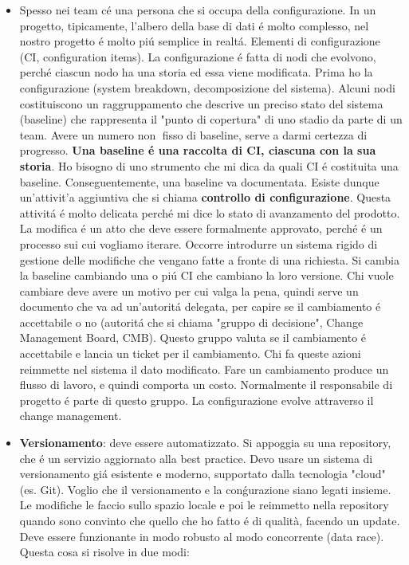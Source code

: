 \documentclass[a4paper,10pt] {article}
\begin{document}
\begin{itemize}
	\item Spesso nei team c\'e una persona che si occupa della configurazione. 
	In un progetto, tipicamente, l'albero della base
	di dati \'e molto complesso, nel nostro progetto \'e molto pi\'u semplice 
	in realt\'a.
	Elementi di configurazione (CI, configuration items). 
	La configurazione \'e fatta di nodi che evolvono, perch\'e ciascun 
	nodo ha una storia ed essa viene modificata. Prima ho la configurazione 
	(system breakdown, decomposizione del 
	sistema). 
	Alcuni nodi costituiscono un raggruppamento che 
	descrive un preciso stato del sistema (baseline) che rappresenta il "punto 
	di copertura" di uno stadio da 
	parte di un team. Avere un numero non fisso di baseline, serve a darmi 
	certezza di progresso. 
	\textbf{Una baseline \'e una raccolta di CI, ciascuna con la sua storia}. 
	Ho 
	bisogno di uno strumento che mi dica da quali CI \'e costituita una 
	baseline. 
	Conseguentemente, una baseline va documentata. Esiste
	dunque un'attivit'a aggiuntiva che si chiama \textbf{controllo di 
	configurazione}. 
	Questa attivit\'a \'e molto delicata
	perch\'e mi dice lo stato di avanzamento del prodotto. La modifica \'e un 
	atto 
	che deve essere formalmente
	approvato, perch\'e \'e un processo sui cui vogliamo iterare. Occorre 
	introdurre un sistema rigido di gestione
	delle modifiche che vengano fatte a fronte di una richiesta. Si cambia la 
	baseline cambiando una o pi\'u CI
	che cambiano la loro versione. Chi vuole cambiare deve avere un motivo per 
	cui valga la pena, quindi serve
	un documento che va ad un'autorit\'a delegata, per capire se il cambiamento 
	\'e accettabile o no (autorit\'a che
	si chiama "gruppo di decisione", Change Management Board, CMB). Questo 
	gruppo valuta se il cambiamento \'e accettabile e lancia un ticket per il 
	cambiamento. Chi fa queste 
	azioni reimmette nel sistema il dato
	modificato. Fare un cambiamento produce un 
    flusso di lavoro, e quindi 
	comporta un costo. Normalmente il
	responsabile di progetto \'e parte di questo gruppo. La configurazione 
	evolve	attraverso il change management.
	
	\item \textbf{Versionamento}:  deve essere automatizzato. Si appoggia su 
	una repository, che \'e un servizio aggiornato alla
	best practice. Devo usare un sistema di versionamento gi\'a esistente e 
	moderno, supportato dalla tecnologia
	"cloud" (es. Git). Voglio che il versionamento e la con\'gurazione siano 
	legati insieme. Le modifiche le faccio
	sullo spazio locale e poi le reimmetto nella repository quando sono 
	convinto che quello che ho fatto \'e di qualità,
	facendo un update. Deve essere funzionante in modo robusto al modo 
	concorrente (data race). Questa cosa
	si risolve in due modi:
	

\end{itemize}
\end{document}
